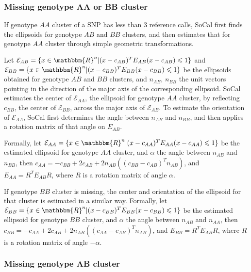 \documentclass{scrartcl}
\begin{document}
\subsubsection{Missing genotype AA or BB cluster}

\par
If genotype $AA$ cluster of a SNP has less than 3 reference calls, SoCal
first finds the ellipsoids for genotype $AB$ and $BB$ clusters, and then
estimates that for genotype $AA$ cluster through simple geometric
transformations.

\par
Let $\mathcal{E}_{AB}=
\{x \in \mathbbm{R}^{n}|(x-c_{AB})^TE_{AB}(x-c_{AB}) \leqslant 1\}$
and $\mathcal{E}_{BB}=
\{x \in \mathbbm{R}^{n}|(x-c_{BB})^TE_{BB}(x-c_{BB}) \leqslant 1\}$
be the ellipsoids obtained for genotype $AB$ and $BB$ clusters,
and $n_{AB}$, $n_{BB}$ the unit vectors pointing in the direction of
the major axis of the corresponding ellipsoid.
SoCal estimates the center of $\mathcal{E}_{AA}$, the ellipsoid for genotype
$AA$ cluster, by reflecting $c_{BB}$, the center of $\mathcal{E}_{BB}$, across
the major axis of $\mathcal{E}_{AB}$.
To estimate the orientation of $\mathcal{E}_{AA}$, SoCal first determines the
angle between $n_{AB}$ and $n_{BB}$, and then applies a rotation matrix of
that angle on $E_{AB}$.

\par
Formally, let $\mathcal{E}_{AA}=
\{x \in \mathbbm{R}^{n}|(x-c_{AA})^TE_{AA}(x-c_{AA}) \leqslant 1\}$ be the
estimated ellipsoid for genotype $AA$ cluster, and $\alpha$ the angle between
$n_{AB}$ and $n_{BB}$, then
$c_{AA}=-c_{BB}+2c_{AB}+2n_{AB}((c_{BB}-c_{AB})^{T}n_{AB})$, and
$E_{AA}=R^{T}E_{AB}R$, where $R$ is a rotation matrix of angle $\alpha$.

\par
If genotype $BB$ cluster is missing, the center and orientation of the
ellipsoid for that cluster is estimated in a similar way.
Formally, let $\mathcal{E}_{BB}=
\{x \in \mathbbm{R}^{n}|(x-c_{BB})^TE_{BB}(x-c_{BB}) \leqslant 1\}$ be the
estimated ellipsoid for genotype $BB$ cluster, and $\alpha$ the angle between
$n_{AB}$ and $n_{AA}$, then
$c_{BB}=-c_{AA}+2c_{AB}+2n_{AB}((c_{AA}-c_{AB})^{T}n_{AB})$, and
$E_{BB}=R^{T}E_{AB}R$, where $R$ is a rotation matrix of angle $-\alpha$.

\subsubsection{Missing genotype AB cluster}
\end{document}
